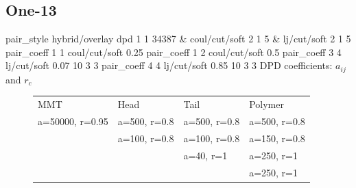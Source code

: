 \documentclass[a4paper]{article}
\begin{document}
\subsection*{One-13}
pair\_style hybrid/overlay dpd 1 1 34387 \& coul/cut/soft 2 1 5 \& 
lj/cut/soft 2 1 5\newline
pair\_coeff 1 1 coul/cut/soft 0.25
pair\_coeff 1 2 coul/cut/soft 0.5\newline
pair\_coeff 3 4 lj/cut/soft 0.07    10 3 3\newline
pair\_coeff 4 4 lj/cut/soft 0.85    10 3 3\newline
DPD coefficients: $a_{ij}$ and $r_c$
\begin{figure}[H]\begin{tabular}{llll}
MMT             & Head         & Tail         & Polymer      \\
a=50000, r=0.95 & a=500, r=0.8 & a=500, r=0.8 & a=500, r=0.8 \\
                & a=100, r=0.8 & a=100, r=0.8 & a=150, r=0.8 \\
                &              & a=40,  r=1   & a=250, r=1   \\
                &              &              & a=250, r=1   \\
\end{tabular}\end{figure}
\end{document}
